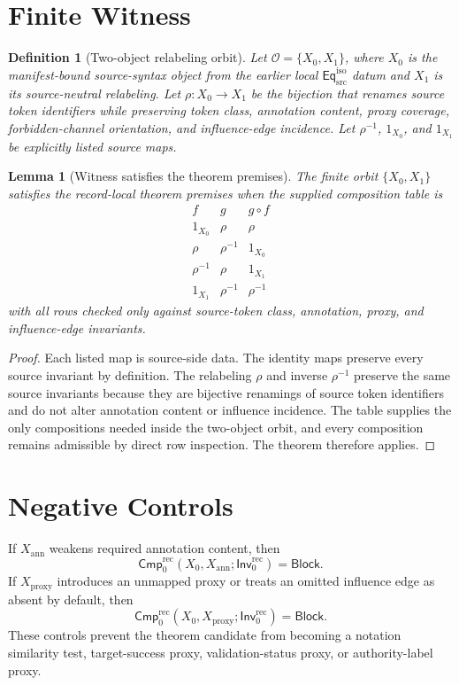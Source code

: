 \documentclass[11pt]{article}
\newcommand{\EqIso}{\mathsf{Eq}_{\mathrm{src}}^{\mathrm{iso}}}
\newcommand{\Inv}{\mathsf{Inv}_{0}^{\mathrm{rec}}}
\newcommand{\Cmp}{\mathsf{Cmp}_{0}^{\mathrm{rec}}}
\newcommand{\Block}{\mathsf{Block}}
\newtheorem{definition}{Definition}
\newtheorem{lemma}{Lemma}
\begin{document}
\section{Finite Witness}

\begin{definition}[Two-object relabeling orbit]
Let \(\mathcal O=\{X_0,X_1\}\), where \(X_0\) is the manifest-bound
source-syntax object from the earlier local \(\EqIso\) datum and \(X_1\) is
its source-neutral relabeling. Let \(\rho:X_0\to X_1\) be the bijection that
renames source token identifiers while preserving token class, annotation
content, proxy coverage, forbidden-channel orientation, and influence-edge
incidence. Let \(\rho^{-1}\), \(1_{X_0}\), and \(1_{X_1}\) be explicitly
listed source maps.
\end{definition}

\begin{lemma}[Witness satisfies the theorem premises]
The finite orbit \(\{X_0,X_1\}\) satisfies the record-local theorem premises
when the supplied composition table is
\[
\begin{array}{c|c|c}
f & g & g\circ f \\
\hline
1_{X_0} & \rho & \rho \\
\rho & \rho^{-1} & 1_{X_0} \\
\rho^{-1} & \rho & 1_{X_1} \\
1_{X_1} & \rho^{-1} & \rho^{-1}
\end{array}
\]
with all rows checked only against source-token class, annotation, proxy, and
influence-edge invariants.
\end{lemma}

\begin{proof}
Each listed map is source-side data. The identity maps preserve every
source invariant by definition. The relabeling \(\rho\) and inverse
\(\rho^{-1}\) preserve the same source invariants because they are bijective
renamings of source token identifiers and do not alter annotation content or
influence incidence. The table supplies the only compositions needed inside
the two-object orbit, and every composition remains admissible by direct row
inspection. The theorem therefore applies.
\end{proof}

\section{Negative Controls}

If \(X_{\mathrm{ann}}\) weakens required annotation content, then
\[
  \Cmp(X_0,X_{\mathrm{ann}};\Inv)=\Block.
\]
If \(X_{\mathrm{proxy}}\) introduces an unmapped proxy or treats an omitted
influence edge as absent by default, then
\[
  \Cmp(X_0,X_{\mathrm{proxy}};\Inv)=\Block.
\]
These controls prevent the theorem candidate from becoming a notation
similarity test, target-success proxy, validation-status proxy, or
authority-label proxy.
\end{document}
